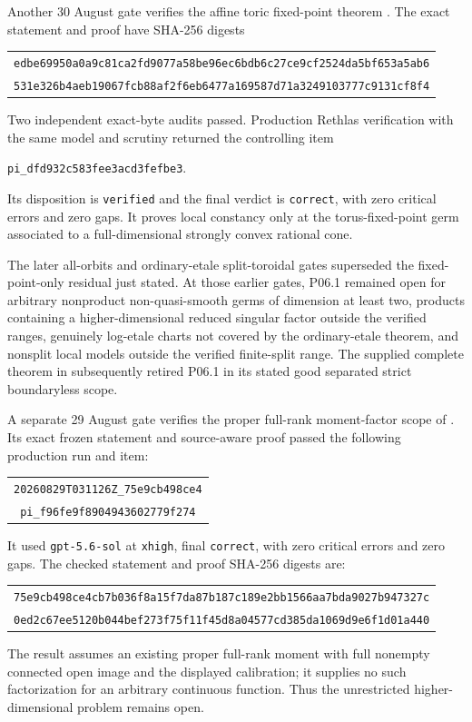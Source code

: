 Another 30 August gate verifies the affine toric fixed-point theorem
.  The exact statement and proof
have SHA-256 digests
\begin{center}
\small
\begin{tabular}{@{}c@{}}
\nolinkurl{edbe69950a0a9c81ca2fd9077a58be96ec6bdb6c27ce9cf2524da5bf653a5ab6}\\
\nolinkurl{531e326b4aeb19067fcb88af2f6eb6477a169587d71a3249103777c9131cf8f4}
\end{tabular}
\end{center}
Two independent exact-byte audits passed.  Production Rethlas verification
with the same model and scrutiny returned the controlling item
\begin{center}
\small
\nolinkurl{pi_dfd932c583fee3acd3fefbe3}.
\end{center}
Its disposition is \texttt{verified} and the final verdict is
\texttt{correct}, with zero critical errors and zero gaps.  It proves local
constancy only at the torus-fixed-point germ associated to a
full-dimensional strongly convex rational cone.

The later all-orbits and ordinary-etale split-toroidal gates superseded the
fixed-point-only residual just stated. At those earlier gates, P06.1 remained
open for arbitrary nonproduct non-quasi-smooth germs of dimension at least two, products
containing a higher-dimensional reduced singular factor outside the verified
ranges, genuinely log-etale charts not covered by the ordinary-etale theorem,
and nonsplit local models outside the verified finite-split range.
The supplied complete theorem in
 subsequently retired P06.1 in its
stated good separated strict boundaryless scope.

A separate 29 August gate verifies the proper full-rank moment-factor scope
of .  Its exact frozen statement and
source-aware proof passed the following production run and item:
\begin{center}
\small
\begin{tabular}{@{}c@{}}
\nolinkurl{20260829T031126Z_75e9cb498ce4}\\
\nolinkurl{pi_f96fe9f8904943602779f274}
\end{tabular}
\end{center}
It used
\texttt{gpt-5.6-sol} at \texttt{xhigh}, final \texttt{correct}, with zero
critical errors and zero gaps.  The checked statement and proof SHA-256
digests are:
\begin{center}
\small
\begin{tabular}{@{}c@{}}
\nolinkurl{75e9cb498ce4cb7b036f8a15f7da87b187c189e2bb1566aa7bda9027b947327c}\\
\nolinkurl{0ed2c67ee5120b044bef273f75f11f45d8a04577cd385da1069d9e6f1d01a440}
\end{tabular}
\end{center}
The result assumes an existing proper full-rank moment with full nonempty
connected open image and the displayed calibration; it supplies no such factorization
for an arbitrary continuous function.  Thus the unrestricted
higher-dimensional problem remains open.

